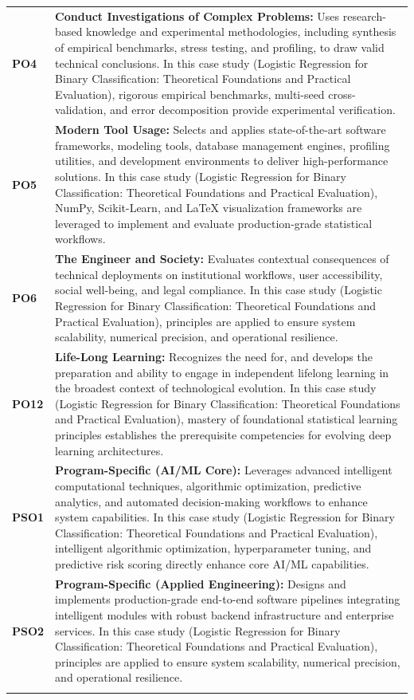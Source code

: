 {\begin{longtable}{@{}>{\centering\arraybackslash}p{1.8cm} p{13.2cm}@{}}
    \addlinespace
\textbf{PO4} & \textbf{Conduct Investigations of Complex Problems:} Uses research-based knowledge and experimental methodologies, including synthesis of empirical benchmarks, stress testing, and profiling, to draw valid technical conclusions. In this case study (Logistic Regression for Binary Classification: Theoretical Foundations and Practical Evaluation), rigorous empirical benchmarks, multi-seed cross-validation, and error decomposition provide experimental verification. \\
    \addlinespace
\textbf{PO5} & \textbf{Modern Tool Usage:} Selects and applies state-of-the-art software frameworks, modeling tools, database management engines, profiling utilities, and development environments to deliver high-performance solutions. In this case study (Logistic Regression for Binary Classification: Theoretical Foundations and Practical Evaluation), NumPy, Scikit-Learn, and LaTeX visualization frameworks are leveraged to implement and evaluate production-grade statistical workflows. \\
    \addlinespace
\textbf{PO6} & \textbf{The Engineer and Society:} Evaluates contextual consequences of technical deployments on institutional workflows, user accessibility, social well-being, and legal compliance. In this case study (Logistic Regression for Binary Classification: Theoretical Foundations and Practical Evaluation), principles are applied to ensure system scalability, numerical precision, and operational resilience. \\
    \addlinespace
\textbf{PO12} & \textbf{Life-Long Learning:} Recognizes the need for, and develops the preparation and ability to engage in independent lifelong learning in the broadest context of technological evolution. In this case study (Logistic Regression for Binary Classification: Theoretical Foundations and Practical Evaluation), mastery of foundational statistical learning principles establishes the prerequisite competencies for evolving deep learning architectures. \\
    \addlinespace
\textbf{PSO1} & \textbf{Program-Specific (AI/ML Core):} Leverages advanced intelligent computational techniques, algorithmic optimization, predictive analytics, and automated decision-making workflows to enhance system capabilities. In this case study (Logistic Regression for Binary Classification: Theoretical Foundations and Practical Evaluation), intelligent algorithmic optimization, hyperparameter tuning, and predictive risk scoring directly enhance core AI/ML capabilities. \\
    \addlinespace
\textbf{PSO2} & \textbf{Program-Specific (Applied Engineering):} Designs and implements production-grade end-to-end software pipelines integrating intelligent modules with robust backend infrastructure and enterprise services. In this case study (Logistic Regression for Binary Classification: Theoretical Foundations and Practical Evaluation), principles are applied to ensure system scalability, numerical precision, and operational resilience. \\
    \addlinespace
    \bottomrule
\end{longtable}}